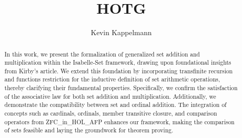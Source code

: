 \documentclass[11pt,a4paper]{article}
\begin{document}
\title{HOTG}
\author{Kevin Kappelmann}
\maketitle

\begin{abstract}
In this work, we present the formalization of generalized set addition and multiplication within
 the Isabelle-Set framework, drawing upon foundational insights from Kirby's article. We extend 
this foundation by incorporating transfinite recursion and functions restriction for the inductive
 definition of set arithmetic operations, thereby clarifying their fundamental properties. 
Specifically, we confirm the satisfaction of the associative law for both set addition and
 multiplication. Additionally, we demonstrate the compatibility between set and ordinal addition. 
The integration of concepts such as cardinals, ordinals, member transitive closure, and comparison
 operators from ZFC_in_HOL_AFP enhances our framework, making the comparison of sets feasible and 
laying the groundwork for theorem proving. 
\end{abstract}

\tableofcontents





\end{document}
